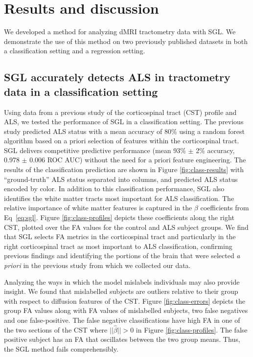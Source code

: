 \section*{Results and discussion}

We developed a method for analyzing dMRI tractometry data with SGL. We
demonstrate the use of this method on two previously published datasets in both
a classification setting and a regression setting.

\subsection*{SGL accurately detects ALS in tractometry data in a classification setting}

Using data from a previous study of the corticospinal tract (CST) profile and
ALS\cite{sarica2017corticospinal}, we tested the performance of SGL in a
classification setting. The previous study predicted ALS status with a mean
accuracy of 80\% using a random forest algorithm based on a priori selection of
features within the corticospinal tract. SGL delivers competitive predictive
performance (mean 93\% $\pm$ 2\% accuracy, 0.978 $\pm$ 0.006 ROC AUC) without
the need for a priori feature engineering. The results of the classification
prediction are shown in Figure \ref{fig:class-results} with ``ground-truth'' ALS
status separated into columns, and predicted ALS status encoded by color. In
addition to this classification performance, SGL also identifies the white
matter tracts most important for ALS classification. The relative importance of
white matter features is captured in the $\beta$ coefficients from
Eq~\eqref{eq:sgl}. Figure \ref{fig:class-profiles} depicts these coefficients along
the right CST, plotted over the FA values for the control and ALS subject
groups. We find that SGL selects FA metrics in the corticospinal tract and
particularly in the right corticospinal tract as most important to ALS
classification, confirming previous findings\cite{van2011upper,
toosy2003diffusion, sarica2014tractography, sage2007quantitative,
sage2009quantitative, karlsborg2004corticospinal, ellis1999diffusion,
cosottini2005diffusion, ciccarelli2009investigation, abe2010voxel} and
identifying the portions of the brain that were selected \emph{a priori} in the
previous study from which we collected our data\cite{sarica2017corticospinal}.

Analyzing the ways in which the model mislabels individuals may also provide
insight. We found that mislabelled subjects are outliers relative to their group
with respect to diffusion features of the CST. Figure \ref{fig:class-errors}
depicts the group FA values along with FA values of mislabelled subjects, two
false negatives and one false-positive. The false negative classifications have
high FA in one of the two sections of the CST where $||\hat{\beta}|| > 0$ in
Figure \ref{fig:class-profiles}. The false positive subject has an FA that
oscillates between the two group means. Thus, the SGL method fails
comprehensibly.

